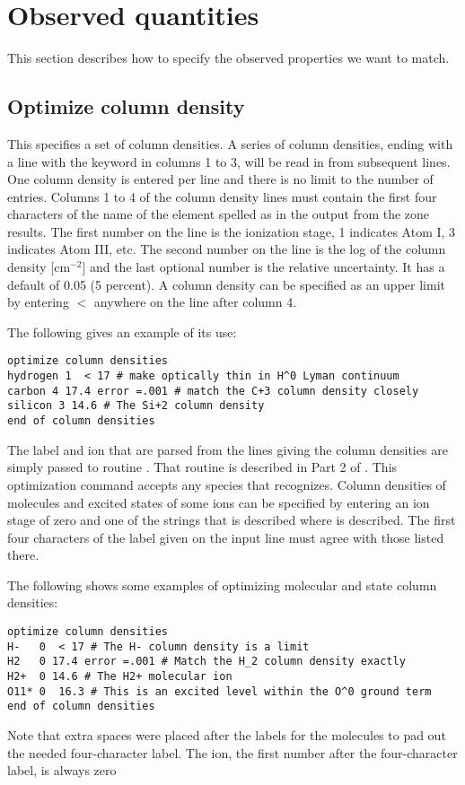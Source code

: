 \section{Observed quantities}
\label{sec:observed_quantities}

This section describes how to specify the observed properties we want
to match.

\subsection{Optimize column density}

This specifies a set of column densities.
A series of column densities,
ending with a line with the keyword  in columns 1 to 3,
will be read
in from subsequent lines.
One column density is entered per line and there is no limit to
the number of entries.
Columns 1 to 4 of the column density lines must
contain the first four characters of the name of the element spelled as
in the output from the zone results.
The first number on the line is the
ionization stage, 1 indicates Atom I, 3 indicates Atom III, etc.
The second
number on the line is the log of the column density [cm$^{-2}$]
and the last
optional number is the relative uncertainty.
It has a default of 0.05 (5
percent).
A column density can be specified as an upper limit by entering
$<$ anywhere on the line after column 4.

The following gives an example of its use:
\begin{verbatim}
optimize column densities
hydrogen 1  < 17 # make optically thin in H^0 Lyman continuum
carbon 4 17.4 error =.001 # match the C+3 column density closely
silicon 3 14.6 # The Si+2 column density
end of column densities
\end{verbatim}

The label
and ion that are parsed from the lines giving the column densities
are simply
passed to routine .
That routine is described in Part 2 of \Hazy.
This optimization command accepts any species that
 recognizes.
Column densities of molecules and excited states of some ions
can be specified by entering an ion stage of zero and one of the strings
that is described where  is described.
The first four characters
of the label given on the input line must agree with those listed there.

The following shows some examples of optimizing molecular and state column
densities:
\begin{verbatim}
optimize column densities
H-   0  < 17 # The H- column density is a limit
H2   0 17.4 error =.001 # Match the H_2 column density exactly
H2+  0 14.6 # The H2+ molecular ion
O11* 0  16.3 # This is an excited level within the O^0 ground term
end of column densities
\end{verbatim}
Note that extra spaces were placed after the labels for the molecules to
pad out the needed four-character label.
The ion, the first number after
the four-character label, is always zero


